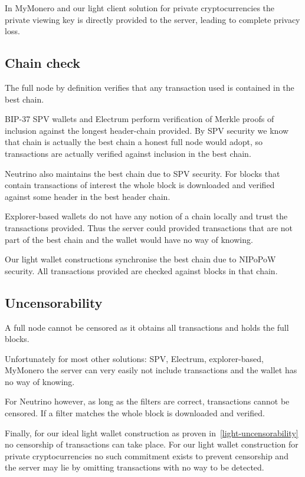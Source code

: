 In MyMonero and our light client solution for private cryptocurrencies the private viewing key is directly provided to the server, leading to complete privacy loss.

\subsection{Chain check}
The full node by definition verifies that any transaction used is contained in the best chain.

BIP-37 SPV wallets and Electrum perform verification of Merkle proofs of inclusion against the longest header-chain provided. By SPV security we know that chain is actually the best chain a honest full node would adopt, so transactions are actually verified against inclusion in the best chain.

Neutrino also maintains the best chain due to SPV security. For blocks that contain transactions of interest the whole block is downloaded and verified against some header in the best header chain.

Explorer-based wallets do not have any notion of a chain locally and trust the transactions provided. Thus the server could provided transactions that are not part of the best chain and the wallet would have no way of knowing.

Our light wallet constructions synchronise the best chain due to NIPoPoW security. All transactions provided are checked against blocks in that chain.


\subsection{Uncensorability}
A full node cannot be censored as it obtains all transactions and holds the full blocks.

Unfortunately for most other solutions: SPV, Electrum, explorer-based, MyMonero the server can very easily not include transactions and the wallet has no way of knowing.

For Neutrino however, as long as the filters are correct, transactions cannot be censored. If a filter matches the whole block is downloaded and verified.

Finally, for our ideal light wallet construction as proven in~\cref{light-uncensorability} no censorship of transactions can take place.
For our light wallet construction for private cryptocurrencies no such commitment exists to prevent censorship and the server may lie by omitting transactions with no way to be detected.
